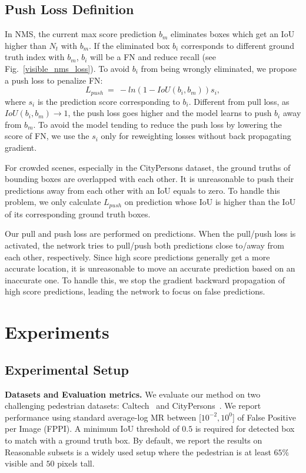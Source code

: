 \documentclass[sigconf]{acmart}
\begin{document}
\subsection{Push Loss Definition}
In NMS, the current max score prediction $b_{m}$ eliminates boxes which get an IoU higher than $N_{t}$ with $b_{m}$. If the eliminated box $b_{i}$ corresponds to different ground truth index with $b_{m}$, $b_{i}$ will be a FN and reduce recall (see Fig.~\ref{visible_nms_loss}). To avoid $b_{i}$ from being wrongly eliminated, we propose a push loss to penalize FN:
\begin{equation}
L_{push}\ =\ -ln(1-IoU(b_{i},b_{m}))s_{i},
\label{Push_Loss}
\end{equation}
where $s_{i}$ is the prediction score corresponding to $b_{i}$. Different from pull loss, as $IoU(b_{i},b_{m}) \to 1$, the push loss goes higher and the model learns to push $b_{i}$ away from $b_{m}$. To avoid the model tending to reduce the push loss by lowering the score of FN, we use the $s_{i}$ only for reweighting losses without back propagating gradient.

For crowded scenes, especially in the CityPersons dataset, the ground truths of bounding boxes are overlapped with each other.
It is unreasonable to push their predictions away from each other with an IoU equals to zero. To handle this problem, we only calculate $L_{push}$ on prediction whose IoU is higher than the IoU of its corresponding ground truth boxes.

Our pull and push loss are performed on predictions. When the pull/push loss is activated, the network tries to pull/push both predictions close to/away from each other, respectively.
Since high score predictions generally get a more accurate location, it is unreasonable to move an accurate prediction based on an inaccurate one. To handle this, we stop the gradient backward propagation of high score predictions, leading the network to focus on false predictions.

\section{Experiments}
\subsection{Experimental Setup}

\noindent
\textbf{Datasets and Evaluation metrics.} We evaluate our method on two challenging pedestrian datasets: Caltech~\cite{dollar2009pedestrian,dollar2011pedestrian} and CityPersons~\cite{zhang2017citypersons}. We report performance using standard average-log MR between [$10^{-2},10^{0}$] of False Positive per Image (FPPI). A minimum IoU threshold of $0.5$ is required for detected box to match with a ground truth box. By default, we report the results on Reasonable subsets is a widely used setup where the pedestrian is at least $65\%$ visible and $50$ pixels tall.
\end{document}
